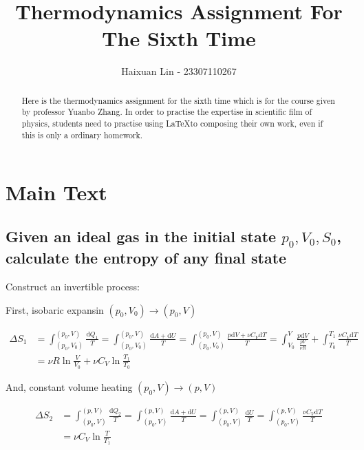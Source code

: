 \documentclass[a4paper,11pt]{amsart}
\title{Thermodynamics Assignment For The Sixth Time}
\author{Haixuan Lin - 23307110267}
\theoremstyle{definition}
\begin{document}
	
	\begin{abstract}
		Here is the thermodynamics assignment for the sixth time which is for the course given by professor Yuanbo Zhang. In order to practise the expertise in scientific film of physics, students need to practise using \LaTeX to composing their own work, even if this is only a ordinary homework.
	\end{abstract}
	
	\maketitle
	\section*{Main Text}
	
	\subsection*{Given an ideal gas in the initial state $p_0, V_0, S_0$, calculate the entropy of any final state	}
	
	Construct an invertible process: 
	
	First, isobaric expansin $(p_0, V_0)\rightarrow(p_0, V)$
	
	\begin{align}
			\Delta S_1 &= \int_{\left( p_0,V_0 \right)}^{\left( p_0,V \right)}{\frac{\mathrm{d}Q_1}{T}} 
			= \int_{\left( p_0,V_0 \right)}^{\left( p_0,V \right)}{\frac{\mathrm{d}A+\mathrm{d}U}{T}} 
			= \int_{\left( p_0,V_0 \right)}^{\left( p_0,V \right)}{\frac{p\mathrm{d}V+\nu C_V\mathrm{d}T}{T}} 
			= \int_{V_0}^V{\frac{p\mathrm{d}V}{\frac{pV}{\nu R}}}+\int_{T_0}^{T_1}{\frac{\nu C_V\mathrm{d}T}{T}} \\
			&= \nu R\ln \frac{V}{V_0}+\nu C_V\ln \frac{T_1}{T_0}
	\end{align}
	
	And, constant volume heating $(p_0, V)\rightarrow(p,V)$
	
	\begin{align}
		\Delta S_2&=\int_{\left( p_0,V \right)}^{\left( p,V \right)}{\frac{\mathrm{d}Q_2}{T}}=\int_{\left( p_0,V \right)}^{\left( p,V \right)}{\frac{\mathrm{d}A+\mathrm{d}U}{T}=}\int_{\left( p_0,V \right)}^{\left( p,V \right)}{\frac{\mathrm{d}U}{T}}=\int_{\left( p_0,V \right)}^{\left( p,V \right)}{\frac{\nu C_V\mathrm{d}T}{T}}\\
		&=\nu C_V\ln \frac{T}{T_1}
	\end{align}
	
\end{document}
